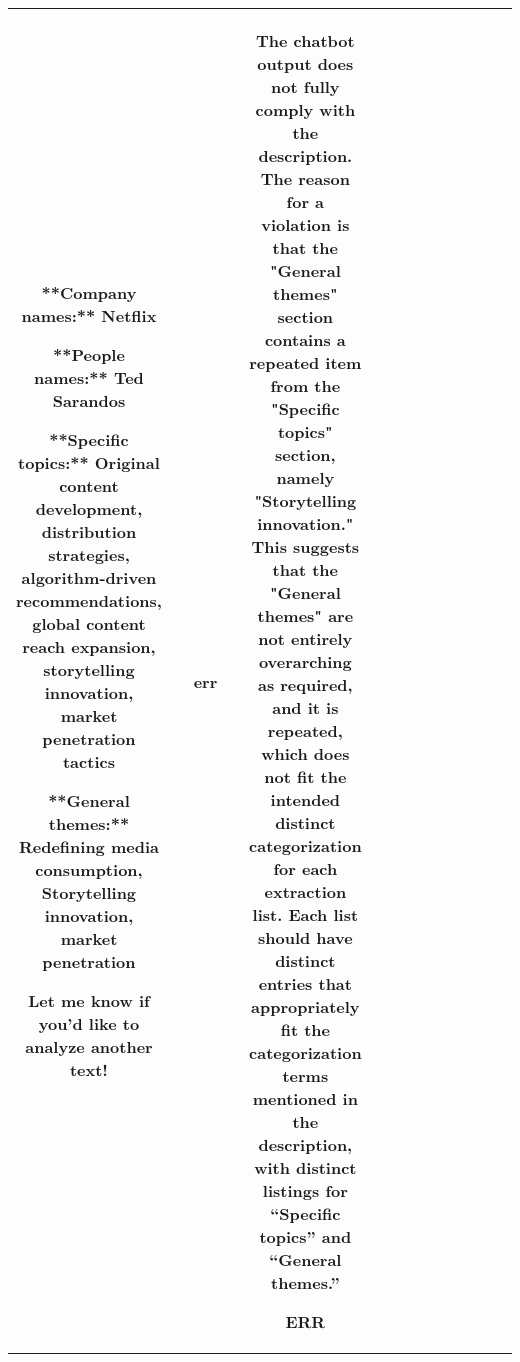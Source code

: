 \begin{table}[h!]
\begin{tabular}{|c|c|c|c|c|c|c|c|c|c|c|}
**Company names:** Netflix

**People names:** Ted Sarandos 

**Specific topics:** Original content development, distribution strategies, algorithm-driven recommendations, global content reach expansion, storytelling innovation, market penetration tactics 

**General themes:**  Redefining media consumption, Storytelling innovation, market penetration 


Let me know if you'd like to analyze another text! & err & The chatbot output does not fully comply with the description. The reason for a violation is that the "General themes" section contains a repeated item from the "Specific topics" section, namely "Storytelling innovation." This suggests that the "General themes" are not entirely overarching as required, and it is repeated, which does not fit the intended distinct categorization for each extraction list. Each list should have distinct entries that appropriately fit the categorization terms mentioned in the description, with distinct listings for “Specific topics” and “General themes.”

ERR\\
\hline
25aecda & e5ed513 & NaN &  & 1 & gemma2:9b &  & Text: "The pharmaceutical company Johnson \& Johnson released data on a new vaccine at an international health symposium. CEO Alex Gorsky underscored the significance of multinational collaborations in tackling infectious diseases. The symposium highlighted topics like clinical trial innovations and public health preparedness, contributing to a theme of global healthcare improvement."

Company names: Johnson \& Johnson  
People names: Alex Gorsky  
Specific topics: New vaccine data, multinational collaborations, clinical trial innovations, public health preparedness  
General themes: Global healthcare improvement & You've got it right! That's exactly the format and extraction we're looking for. 

**Here's a breakdown of why your answers are accurate:**

* **Company names:** "Johnson \& Johnson" is clearly stated as a pharmaceutical company in the text.
* **People names:**  "Alex Gorsky" is identified as the CEO of Johnson \& Johnson.
* **Specific topics:** The text mentions these specific areas: 
    * "New vaccine data" - directly stated.
    * "Multinational collaborations" - a key point emphasized by Alex Gorsky.
    * "Clinical trial innovations" - mentioned as part of the symposium's focus.
    * "Public health preparedness" - another highlighted topic at the symposium.
* **General themes:**  The overall message revolves around "Global healthcare improvement,"  which is directly stated and supported by all the mentioned details. 




\end{tabular}
\end{table}
